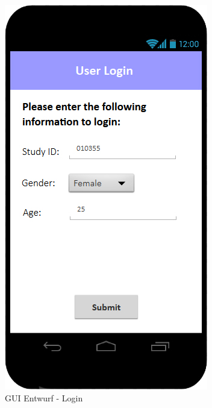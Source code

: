 \documentclass[a4paper]{scrreprt}
\begin{document}
                \vspace*{1cm}
                \begin{figure}[ht]
                    \centering
                    \includegraphics[scale = 0.3]{android_login.jpg}
                    \caption{GUI Entwurf - Login}
                \end{figure}
\end{document}
